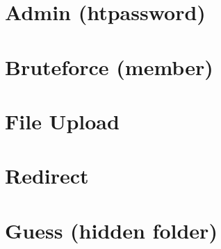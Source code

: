 


\section{Admin (htpassword)}




\section{Bruteforce (member)}




\section{File Upload}




\section{Redirect}




\section{Guess (hidden folder)}

